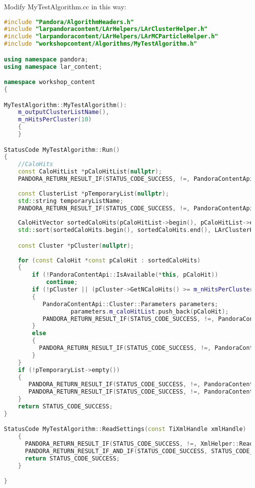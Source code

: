 Modify MyTestAlgorithm.cc in this way:
\begin{lstlisting}[language=C++, label=code:first_cluster, caption=MyTestAlgorithm.cc creates a basic set of clusters]
#include "Pandora/AlgorithmHeaders.h"
#include "larpandoracontent/LArHelpers/LArClusterHelper.h"
#include "larpandoracontent/LArHelpers/LArMCParticleHelper.h"
#include "workshopcontent/Algorithms/MyTestAlgorithm.h"

using namespace pandora;
using namespace lar_content;

namespace workshop_content
{

MyTestAlgorithm::MyTestAlgorithm():
	m_outputClusterListName(),
	m_nHitsPerCluster(10)
	{
	}

StatusCode MyTestAlgorithm::Run()
{
	//CaloHits
	const CaloHitList *pCaloHitList(nullptr);
	PANDORA_RETURN_RESULT_IF(STATUS_CODE_SUCCESS, !=, PandoraContentApi::GetCurrentList(*this, pCaloHitList));
	
	const ClusterList *pTemporaryList(nullptr);
	std::string temporaryListName;
	PANDORA_RETURN_RESULT_IF(STATUS_CODE_SUCCESS, !=, PandoraContentApi::CreateTemporaryListAndSetCurrent(*this, pTemporaryList, temporaryListName));
	
	CaloHitVector sortedCaloHits(pCaloHitList->begin(), pCaloHitList->end());
	std::sort(sortedCaloHits.begin(), sortedCaloHits.end(), LArClusterHelper::SortHitsByPosition);

	const Cluster *pCluster(nullptr);
	
	for (const CaloHit *const pCaloHit : sortedCaloHits)
	{
		if (!PandoraContentApi::IsAvailable(*this, pCaloHit))
		    continue;
		if (!pCluster || (pCluster->GetNCaloHits() >= m_nHitsPerCluster))
		{
		   PandoraContentApi::Cluster::Parameters parameters;
                   parameters.m_caloHitList.push_back(pCaloHit);
		   PANDORA_RETURN_RESULT_IF(STATUS_CODE_SUCCESS, !=, PandoraContentApi::Cluster::Create(*this, parameters, pCluster));
		}
  		else
 		{
		  PANDORA_RETURN_RESULT_IF(STATUS_CODE_SUCCESS, !=, PandoraContentApi::AddToCluster(*this, pCluster, pCaloHit));
		}
	}
	if (!pTemporaryList->empty())
	{
	   PANDORA_RETURN_RESULT_IF(STATUS_CODE_SUCCESS, !=, PandoraContentApi::SaveList<Cluster>(*this, m_outputClusterListName));
	   PANDORA_RETURN_RESULT_IF(STATUS_CODE_SUCCESS, !=, PandoraContentApi::ReplaceCurrentList<Cluster>(*this, m_outputClusterListName));
	}
	return STATUS_CODE_SUCCESS;
}

StatusCode MyTestAlgorithm::ReadSettings(const TiXmlHandle xmlHandle)
	{
	  PANDORA_RETURN_RESULT_IF(STATUS_CODE_SUCCESS, !=, XmlHelper::ReadValue(xmlHandle, "OutputClusterListName", m_outputClusterListName));
	  PANDORA_RETURN_RESULT_IF_AND_IF(STATUS_CODE_SUCCESS, STATUS_CODE_NOT_FOUND, !=, XmlHelper::ReadValue(xmlHandle,"NHitsPerCluster", m_nHitsPerCluster));
	  return STATUS_CODE_SUCCESS;
	}

}
\end{lstlisting}

